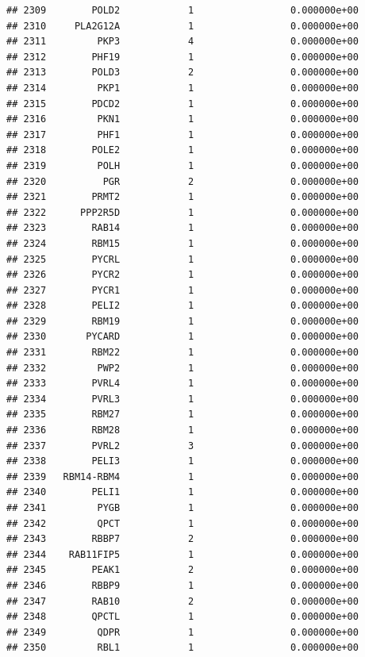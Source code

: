 \documentclass[
]{article}
\begin{document}
\begin{verbatim}
## 2309        POLD2            1                 0.000000e+00
## 2310     PLA2G12A            1                 0.000000e+00
## 2311         PKP3            4                 0.000000e+00
## 2312        PHF19            1                 0.000000e+00
## 2313        POLD3            2                 0.000000e+00
## 2314         PKP1            1                 0.000000e+00
## 2315        PDCD2            1                 0.000000e+00
## 2316         PKN1            1                 0.000000e+00
## 2317         PHF1            1                 0.000000e+00
## 2318        POLE2            1                 0.000000e+00
## 2319         POLH            1                 0.000000e+00
## 2320          PGR            2                 0.000000e+00
## 2321        PRMT2            1                 0.000000e+00
## 2322      PPP2R5D            1                 0.000000e+00
## 2323        RAB14            1                 0.000000e+00
## 2324        RBM15            1                 0.000000e+00
## 2325        PYCRL            1                 0.000000e+00
## 2326        PYCR2            1                 0.000000e+00
## 2327        PYCR1            1                 0.000000e+00
## 2328        PELI2            1                 0.000000e+00
## 2329        RBM19            1                 0.000000e+00
## 2330       PYCARD            1                 0.000000e+00
## 2331        RBM22            1                 0.000000e+00
## 2332         PWP2            1                 0.000000e+00
## 2333        PVRL4            1                 0.000000e+00
## 2334        PVRL3            1                 0.000000e+00
## 2335        RBM27            1                 0.000000e+00
## 2336        RBM28            1                 0.000000e+00
## 2337        PVRL2            3                 0.000000e+00
## 2338        PELI3            1                 0.000000e+00
## 2339   RBM14-RBM4            1                 0.000000e+00
## 2340        PELI1            1                 0.000000e+00
## 2341         PYGB            1                 0.000000e+00
## 2342         QPCT            1                 0.000000e+00
## 2343        RBBP7            2                 0.000000e+00
## 2344    RAB11FIP5            1                 0.000000e+00
## 2345        PEAK1            2                 0.000000e+00
## 2346        RBBP9            1                 0.000000e+00
## 2347        RAB10            2                 0.000000e+00
## 2348        QPCTL            1                 0.000000e+00
## 2349         QDPR            1                 0.000000e+00
## 2350         RBL1            1                 0.000000e+00

\end{verbatim}
\end{document}
